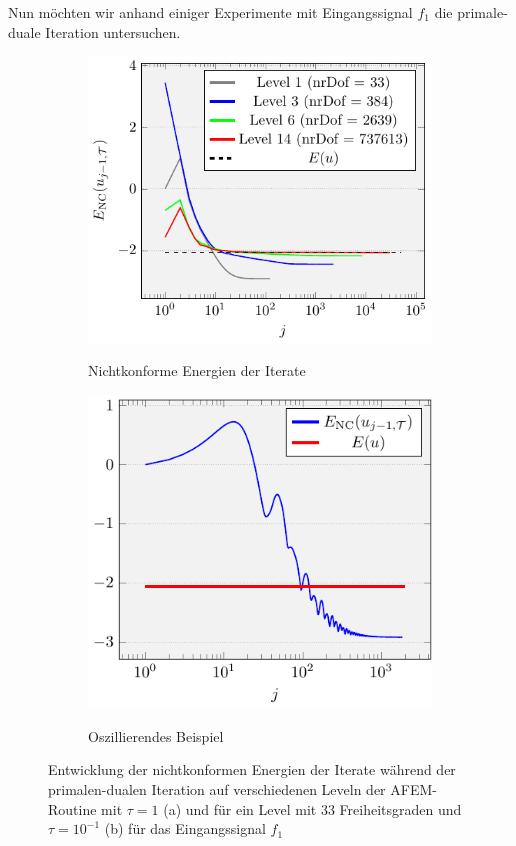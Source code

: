 Nun möchten wir anhand einiger Experimente mit Eingangssignal $f_1$ 
die primale-duale Iteration untersuchen.
\begin{figure}[p]
  \centering
  \begin{subfigure}[b]{.5\linewidth}
    \centering
    \caption{Nichtkonforme Energien der Iterate}
    \includegraphics[width=\linewidth]
      {pictures/chapExperiments/secIterProps/lvlWise/convEnergy.pdf}
    \label{fig:iterationEnergyLevel}
  \end{subfigure}
  \quad
  \begin{subfigure}[b]{.46\linewidth}
    \centering
    \caption{Oszillierendes Beispiel}
    \includegraphics[width=\linewidth]
      {pictures/chapExperiments/secIterProps/osc/convEnergy.pdf}
    \label{fig:iterationEnergyOscillations}
  \end{subfigure}
  \caption{Entwicklung der nichtkonformen Energien der Iterate während der
    pri\-malen\--dualen Iteration auf verschiedenen Leveln der AFEM-Routine mit
    $\tau=1$ (a) und für ein Level mit 33 Freiheitsgraden und $\tau=10^{-1}$
    (b) für das Eingangssignal $f_1$}
  \label{fig:iterationEnergy}
\end{figure}
